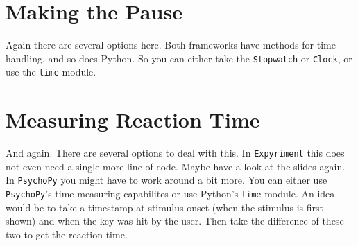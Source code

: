 \pagebreak

\section{Making the Pause}
Again there are several options here. Both frameworks have methods for time handling,
and so does Python. So you can either take the \texttt{Stopwatch} or \texttt{Clock}, or
use the \texttt{time} module.

\pagebreak

\section{Measuring Reaction Time}
And again. There are several options to deal with this. In \texttt{Expyriment} this does
not even need a single more line of code. Maybe have a look at the slides again.\\
In \texttt{PsychoPy} you might have to work around a bit more. You can either use 
\texttt{PsychoPy}'s time measuring capabilites or use Python's \texttt{time} module.
An idea would be to take a timestamp at stimulus onset (when the stimulus
is first shown) and when the key was hit by the user. Then take the difference of these
two to get the reaction time.



